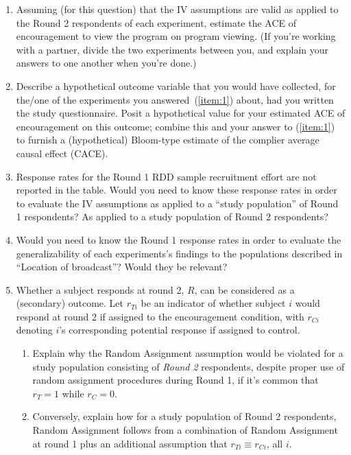 \documentclass{article}
\begin{document}
\begin{enumerate}
\item \label{item:1}Assuming (for this question) that the IV assumptions are valid as applied to the Round 2 respondents of each experiment, estimate the ACE of encouragement to view the program on program viewing. (If you're working with a partner, divide the two experiments between you, and explain your answers to one another when you're done.)
\item Describe a hypothetical outcome variable that you would have collected, for the/one of the experiments you answered~(\ref{item:1}) about,  had you written the study questionnaire. Posit a hypothetical value for your estimated ACE of encouragement on this outcome; combine this and your answer to (\ref{item:1}) to furnish a (hypothetical) Bloom-type estimate of the complier average causal effect (CACE).  
\item Response rates for the Round 1 RDD sample recruitment effort are not reported in the table. Would you need to know these response rates in order to evaluate the IV assumptions as applied to a ``study population'' of Round 1 respondents?  As applied to a study population of Round 2 respondents? 
\item Would you need to know the Round 1 response rates in order to evaluate the generalizability of each experiments's findings to the populations described in ``Location of broadcast''?  Would they be relevant?  
\item Whether a subject responds at round 2, $R$, can be considered as a (secondary) outcome. Let $r_{Ti}$ be an indicator of whether subject $i$ would respond at round 2 if assigned to the encouragement condition, with $r_{Ci}$ denoting $i$'s corresponding potential response if assigned to control.
  \begin{enumerate}
  \item Explain why the Random Assignment assumption would be violated for a study population consisting of \textit{Round 2} respondents, despite proper use of random assignment procedures during Round 1, if it's common that $r_{T}=1$ while $r_{C}=0$.
  \item Conversely, explain how for a study population of Round 2 respondents, Random Assignment follows from a combination of Random Assignment at round 1 plus an additional assumption that $r_{Ti} \equiv r_{Ci}$, all $i$. 
  \end{enumerate}

\end{enumerate}
\end{document}
